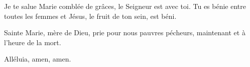 

Je te salue Marie comblée de grâces, le Seigneur est avec toi.
Tu es bénie entre toutes les femmes et Jésus, le fruit de ton sein, est béni.

Sainte Marie, mère de Dieu, prie pour nous pauvres pécheurs,
maintenant et à l’heure de la mort.

Alléluia, amen, amen.

